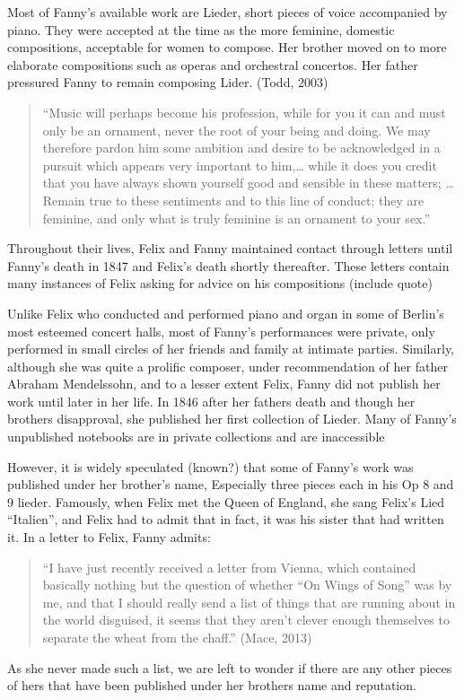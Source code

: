 \documentclass[12pt,twoside]{reedthesis}
\theoremstyle{definition}
\theoremstyle{definition}
\theoremstyle{definition}
\theoremstyle{remark}
\begin{document}
Most of Fanny's available work are Lieder, short pieces of voice
accompanied by piano. They were accepted at the time as the more
feminine, domestic compositions, acceptable for women to compose. Her
brother moved on to more elaborate compositions such as operas and
orchestral concertos. Her father pressured Fanny to remain composing
Lider. (Todd, 2003)
\begin{quote}
``Music will perhaps become his profession, while for you it can and
must only be an ornament, never the root of your being and doing. We may
therefore pardon him some ambition and desire to be acknowledged in a
pursuit which appears very important to him,\ldots{} while it does you
credit that you have always shown yourself good and sensible in these
matters; \ldots{} Remain true to these sentiments and to this line of
conduct; they are feminine, and only what is truly feminine is an
ornament to your sex.''
\end{quote}
Throughout their lives, Felix and Fanny maintained contact through
letters until Fanny's death in 1847 and Felix's death shortly
thereafter. These letters contain many instances of Felix asking for
advice on his compositions (include quote)

Unlike Felix who conducted and performed piano and organ in some of
Berlin's most esteemed concert halls, most of Fanny's performances were
private, only performed in small circles of her friends and family at
intimate parties. Similarly, although she was quite a prolific composer,
under recommendation of her father Abraham Mendelssohn, and to a lesser
extent Felix, Fanny did not publish her work until later in her life. In
1846 after her fathers death and though her brothers disapproval, she
published her first collection of Lieder. Many of Fanny's unpublished
notebooks are in private collections and are inaccessible

However, it is widely speculated (known?) that some of Fanny's work was
published under her brother's name, Especially three pieces each in his
Op 8 and 9 lieder. Famously, when Felix met the Queen of England, she
sang Felix's Lied ``Italien'', and Felix had to admit that in fact, it
was his sister that had written it. In a letter to Felix, Fanny admits:
\begin{quote}
``I have just recently received a letter from Vienna, which contained
basically nothing but the question of whether ``On Wings of Song'' was
by me, and that I should really send a list of things that are running
about in the world disguised, it seems that they aren't clever enough
themselves to separate the wheat from the chaff.'' (Mace, 2013)
\end{quote}
As she never made such a list, we are left to wonder if there are any
other pieces of hers that have been published under her brothers name
and reputation.
\end{document}
